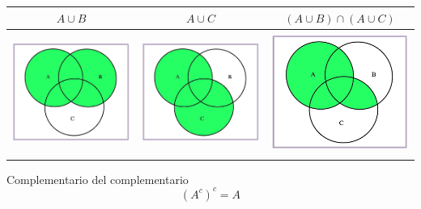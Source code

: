 \documentclass[]{book}
\begin{document}
\begin{longtable}[]{@{}ccc@{}}
\toprule
\(A\cup B\) & \(A\cup C\) & \((A\cup B)\cap (A\cup C)\)\tabularnewline
\midrule
\endhead
\includegraphics[width=\textwidth,height=4cm]{Images/proba1dibujos/distr21.jpg} & \includegraphics[width=\textwidth,height=4cm]{Images/proba1dibujos/distr22.jpg} & \includegraphics[width=\textwidth,height=4cm]{Images/proba1dibujos/distr23.jpg}\tabularnewline
\bottomrule
\end{longtable}

Complementario del complementario
\[(A^c)^c=A\]
\end{document}
